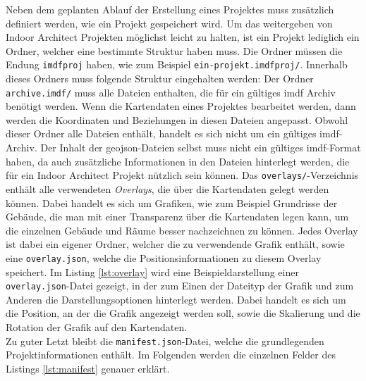 Neben dem geplanten Ablauf der Erstellung eines Projektes muss zusätzlich definiert werden, wie ein Projekt gespeichert wird.
Um das weitergeben von Indoor Architect Projekten möglichst leicht zu halten, ist ein Projekt lediglich ein Ordner, welcher eine bestimmte Struktur haben muss.
Die Ordner müssen die Endung \texttt{imdfproj} haben, wie zum Beispiel \texttt{ein-projekt.imdfproj/}.
Innerhalb dieses Ordners muss folgende Struktur eingehalten werden:
\vspace{5pt}
\vspace{5pt}
Der Ordner \texttt{archive.imdf/} muss alle Dateien enthalten, die für ein gültiges \acl{imdf} Archiv benötigt werden.
Wenn die Kartendaten eines Projektes bearbeitet werden, dann werden die Koordinaten und Beziehungen in diesen Dateien angepasst.
Obwohl dieser Ordner alle Dateien enthält, handelt es sich nicht um ein gültiges \ac{imdf}-Archiv.
Der Inhalt der \ac{geojson}-Dateien selbst muss nicht ein gültiges \ac{imdf}-Format haben, da auch zusätzliche Informationen in den Dateien hinterlegt werden, die für ein Indoor Architect Projekt nützlich sein können.\pbreak%
%
Das \texttt{overlays/}-Verzeichnis enthält alle verwendeten \emph{Overlays}, die über die Kartendaten gelegt werden können.
Dabei handelt es sich um Grafiken, wie zum Beispiel Grundrisse der Gebäude, die man mit einer Transparenz über die Kartendaten legen kann, um die einzelnen Gebäude und Räume besser nachzeichnen zu können.
Jedes Overlay ist dabei ein eigener Ordner, welcher die zu verwendende Grafik enthält, sowie eine \texttt{overlay.json}, welche die Positionsinformationen zu diesem Overlay speichert.
Im Listing \ref{lst:overlay} wird eine Beispieldarstellung einer \texttt{overlay.json}-Datei gezeigt, in der zum Einen der Dateityp der Grafik und zum Anderen die Darstellungsoptionen hinterlegt werden.
Dabei handelt es sich um die Position, an der die Grafik angezeigt werden soll, sowie die Skalierung und die Rotation der Grafik auf den Kartendaten.
\\
Zu guter Letzt bleibt die \texttt{manifest.json}-Datei, welche die grundlegenden Projektinformationen enthält.
Im Folgenden werden die einzelnen Felder des Listings \ref{lst:manifest} genauer erklärt.
\\
